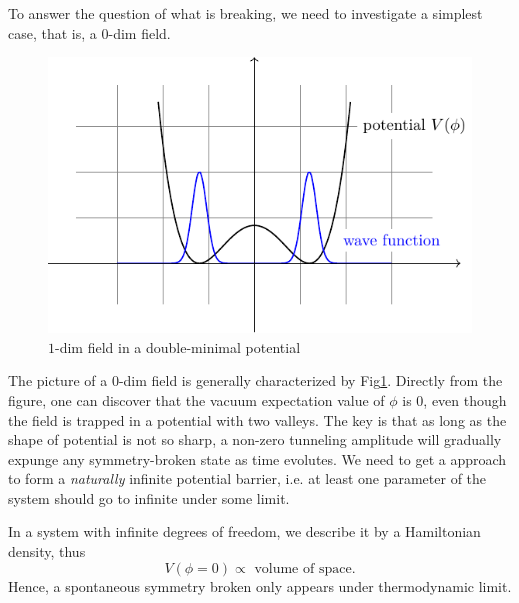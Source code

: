 To answer the question of what is breaking, we need to investigate a simplest case, that is, a $0$-dim field. 
\begin{figure}[hp]
    \centering
    \includegraphics{figures/double_minimum_potential.pdf}
    \caption{$1$-dim field in a double-minimal potential}
    \label{1d_double_minimal}
\end{figure}
The picture of a $0$-dim field is generally characterized by Fig\ref{1d_double_minimal}. Directly from the figure, one can discover that the vacuum expectation value of $\phi$ is $0$, even though the field is trapped in a potential with two valleys. The key is that as long as the shape of potential is not so sharp, a non-zero tunneling amplitude will gradually expunge any symmetry-broken state as time evolutes. We need to get a approach to form a \emph{naturally} infinite potential barrier, i.e. at least one parameter of the system should go to infinite under some limit.

In a system with infinite degrees of freedom, we describe it by a Hamiltonian density, thus
\begin{equation}
    V\left( \phi=0 \right) \propto \text{ volume of space}.
\end{equation}
Hence, a spontaneous symmetry broken only appears under thermodynamic limit.

